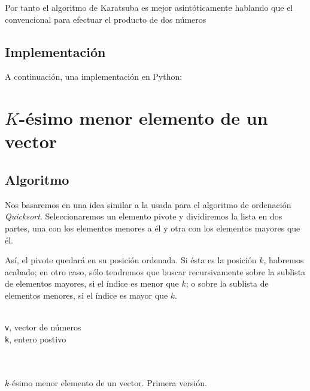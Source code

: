 \documentclass[a4paper, 11pt]{article} %
\begin{document}
Por tanto el algoritmo de Karatsuba es mejor asintóticamente hablando que el convencional para efectuar
el producto de dos números

\subsection{Implementación}
A continuación, una implementación en Python:

\small
\texttt{}
\normalsize

\section {$K$-ésimo menor elemento de un vector}
  \subsection{Algoritmo}
    Nos basaremos en una idea similar a la usada para el algoritmo de ordenación \textit{Quicksort}.
    Seleccionaremos un elemento pivote y dividiremos la lista en dos partes, una con los elementos menores
    a él y otra con los elementos mayores que él.
    
    Así, el pivote quedará en su posición ordenada. Si ésta es
    la posición $k$, habremos acabado; en otro caso, sólo tendremos que buscar recursivamente sobre la 
    sublista de elementos mayores, si el índice es menor que $k$; o sobre la sublista de elementos menores, si el
    índice es mayor que $k$.
    
    \begin{algorithm}[H]
	\begin{algorithmic}[1]
		  \REQUIRE \ \\
		  \texttt{v}, vector de números\\
		  \texttt{k}, entero postivo\\\
	  \\\
	    \RETURN {pivote}
	  \ELSE
	  \ENDIF
	\end{algorithmic}
      \caption{$k$-ésimo menor elemento de un vector. Primera versión.}
      \label{kesimo}
    \end{algorithm}
\end{document}
